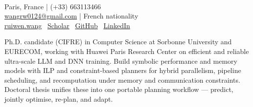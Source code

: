 \documentclass[a4paper,9pt]{article}
\begin{document}
\begin{minipage}[t]{0.54\textwidth}
  \\[1pt]
\end{minipage}
\hfill
\begin{minipage}[t]{0.43\textwidth}
  \raggedleft
  {\footnotesize\color{TextMuted}
  Paris, France \quad | \quad (+33) 663113466 \\
  \href{mailto:wangrw0124@gmail.com}{wangrw0124@gmail.com} \quad | \quad French nationality \\
  \href{http://ruiwen.wang/}{ruiwen.wang} \textperiodcentered\ \href{https://scholar.google.com/citations?user=AR1nHEUAAAAJ}{Scholar} \textperiodcentered\ \href{https://github.com/wang-ruiwen}{GitHub} \textperiodcentered\ \href{https://www.linkedin.com/in/ruiwen-wang-ai/}{LinkedIn}}
\end{minipage}

\vspace{4pt}
\TopRule
\vspace{4pt}

{\footnotesize
Ph.D. candidate (CIFRE) in Computer Science at Sorbonne University and EURECOM, working with Huawei Paris Research Center on efficient and reliable ultra-scale LLM and DNN training. Build symbolic performance and memory models with ILP and constraint-based planners for hybrid parallelism, pipeline scheduling, and recomputation under memory and communication constraints. Doctoral thesis unifies these into one portable planning workflow --- predict, jointly optimise, re-plan, and adapt.}

\vspace{3pt}

\vspace{2pt}
\end{document}
